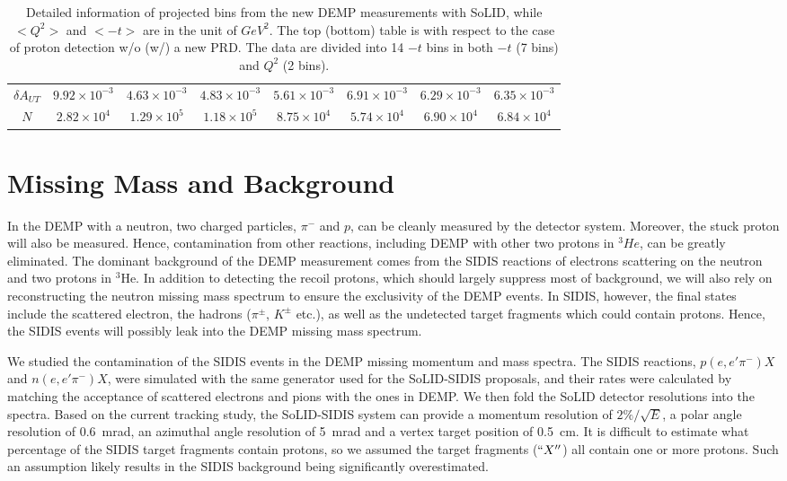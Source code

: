 \begin{table}[!ht]
\begin{tabular}{|c|c|c|c|c|c|c|c|}
	   $\delta A_{UT}$  &  $9.92\times 10^{-3}$   & $4.63\times 10^{-3}$    &   $4.83\times 10^{-3}$  &  $5.61\times 10^{-3}$   &  $6.91\times 10^{-3}$   &   $6.29\times 10^{-3}$ &   $6.35\times 10^{-3}$ \\
	   $N$                     & $2.82\times 10^{4}$   &$1.29\times 10^{5}$   & $1.18\times 10^{5}$   &  $8.75\times 10^{4}$  & $5.74\times 10^{4}$  &  $6.90\times 10^{4}$ &$6.84\times 10^{4}$  \\
 \hline
	\end{tabular}
	\caption[Detailed information of projected bins]{\footnotesize{Detailed information of projected bins from the new DEMP measurements with SoLID, while $<Q^{2}>$ and $<-t>$ are in the unit of $GeV^{2}$. The top (bottom) table is with respect to the case of proton detection w/o (w/) a new PRD. The data are divided into 14 $-t$ bins in both $-t$ (7 bins) and $Q^{2}$ (2 bins). }}
	\label{asym_bin_table}
\end{table} 


\section{Missing Mass and Background}
In the DEMP with a neutron, two charged particles, $\pi^{-}$ and $p$, can be cleanly measured by the detector system. 
Moreover, the stuck proton will also be measured. 
Hence, contamination from other reactions, including DEMP with other two protons in $^{3}He$, can be greatly eliminated.
The dominant background of the DEMP measurement comes from the SIDIS reactions
of electrons scattering on the neutron and two protons in $\mathrm{^{3}He}$. In
addition to detecting the recoil protons, which should largely suppress most of
background, we will also rely on reconstructing the neutron missing mass
spectrum to ensure the exclusivity of the DEMP events. In SIDIS, however, the
final states include the scattered electron, the hadrons ($\pi^{\pm}$,
$K^{\pm}$ etc.), as well as the undetected target fragments which could contain
protons. Hence, the SIDIS events will possibly leak into the DEMP missing mass
spectrum.

We studied the contamination of the SIDIS events in the DEMP missing momentum
and mass spectra. The SIDIS reactions, $p(e,e'\pi^{-})X$ and $n(e,e'\pi^{-})X$,
were simulated with the same generator used for the SoLID-SIDIS proposals, and
their rates were calculated by matching the acceptance of scattered electrons
and pions with the ones in DEMP. We then fold the SoLID detector resolutions
into the spectra. Based on the current tracking study, the SoLID-SIDIS system
can provide a momentum resolution of $2\%/\sqrt{E}$, a polar angle
resolution of 0.6~mrad, an azimuthal angle resolution of 5~mrad and a
vertex target position of 0.5~cm. It is difficult to estimate what
percentage of the SIDIS target fragments contain protons, so we assumed
the target fragments ($``X''$) all contain one or more protons. Such an
assumption likely results in the SIDIS background being significantly
overestimated.

